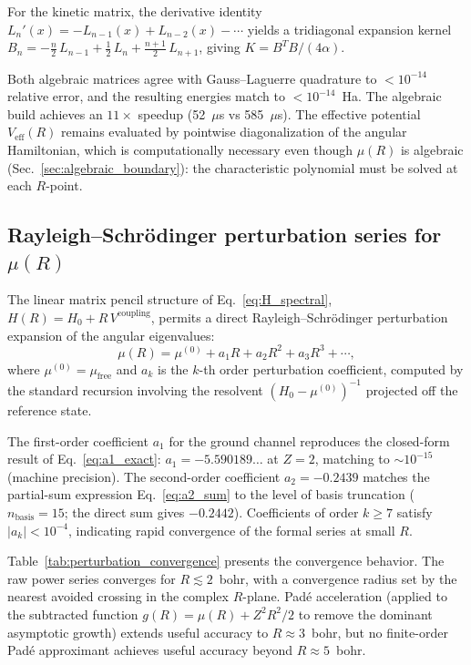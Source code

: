 \documentclass[aps,pra,twocolumn,superscriptaddress,longbibliography]{revtex4-2}
\begin{document}
For the kinetic matrix, the derivative identity
$L_n'(x) = -L_{n-1}(x) + L_{n-2}(x) - \cdots$ yields a tridiagonal
expansion kernel $B_n = -\tfrac{n}{2}\,L_{n-1} + \tfrac{1}{2}\,L_n
+ \tfrac{n+1}{2}\,L_{n+1}$, giving $K = B^T B / (4\alpha)$.

Both algebraic matrices agree with Gauss--Laguerre quadrature to
$< 10^{-14}$ relative error, and the resulting energies match to
$< 10^{-14}$~Ha.  The algebraic build achieves an $11\times$ speedup
(52~$\mu$s vs 585~$\mu$s).  The effective potential $V_{\mathrm{eff}}(R)$
remains evaluated by pointwise diagonalization of the angular
Hamiltonian, which is computationally necessary even though $\mu(R)$
is algebraic (Sec.~\ref{sec:algebraic_boundary}): the characteristic
polynomial must be solved at each $R$-point.

\subsection{Rayleigh--Schr\"odinger perturbation series for $\mu(R)$}
\label{sec:perturbation_series}

The linear matrix pencil structure of Eq.~\eqref{eq:H_spectral},
$H(R) = H_0 + R\,V^{\mathrm{coupling}}$, permits a direct
Rayleigh--Schr\"odinger perturbation expansion of the angular
eigenvalues:
\begin{equation}
  \mu(R) = \mu^{(0)} + a_1 R + a_2 R^2 + a_3 R^3 + \cdots,
  \label{eq:mu_series}
\end{equation}
where $\mu^{(0)} = \mu_{\mathrm{free}}$ and $a_k$ is the $k$-th order
perturbation coefficient, computed by the standard recursion involving
the resolvent $(H_0 - \mu^{(0)})^{-1}$ projected off the reference
state.

The first-order coefficient $a_1$ for the ground channel reproduces
the closed-form result of Eq.~\eqref{eq:a1_exact}:
$a_1 = -5.590189\ldots$ at $Z = 2$, matching to $\sim\!10^{-15}$
(machine precision).  The second-order coefficient
$a_2 = -0.2439$ matches the partial-sum expression
Eq.~\eqref{eq:a2_sum} to the level of basis truncation
($n_{\mathrm{basis}} = 15$; the direct sum gives $-0.2442$).
Coefficients of order $k \ge 7$ satisfy $|a_k| < 10^{-4}$,
indicating rapid convergence of the formal series at small $R$.

Table~\ref{tab:perturbation_convergence} presents the convergence
behavior.  The raw power series converges for $R \lesssim 2$~bohr,
with a convergence radius set by the nearest avoided crossing in the
complex $R$-plane.  Pad\'e acceleration (applied to the subtracted
function $g(R) = \mu(R) + Z^2 R^2/2$ to remove the dominant asymptotic
growth) extends useful accuracy to $R \approx 3$~bohr, but no
finite-order Pad\'e approximant achieves useful accuracy beyond
$R \approx 5$~bohr.
\end{document}
